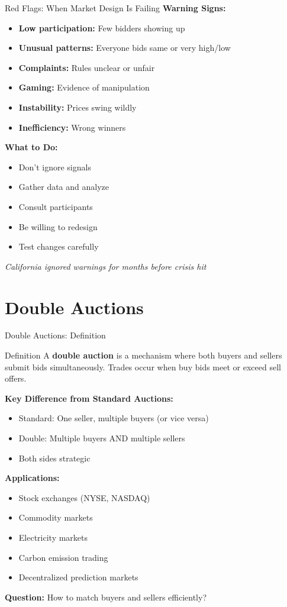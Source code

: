 \documentclass[xcolor={x11names}, aspectratio=169 ]{beamer}
\begin{document}
\begin{frame}{Red Flags: When Market Design Is Failing}
\textbf{Warning Signs:}
\begin{itemize}
  \item \textbf{Low participation:} Few bidders showing up
  \item \textbf{Unusual patterns:} Everyone bids same or very high/low
  \item \textbf{Complaints:} Rules unclear or unfair
  \item \textbf{Gaming:} Evidence of manipulation
  \item \textbf{Instability:} Prices swing wildly
  \item \textbf{Inefficiency:} Wrong winners
\end{itemize}

\textbf{What to Do:}
\begin{itemize}
  \item Don't ignore signals
  \item Gather data and analyze
  \item Consult participants
  \item Be willing to redesign
  \item Test changes carefully
\end{itemize}

\textit{California ignored warnings for months before crisis hit}
\end{frame}

\part{Double Auctions}

\begin{frame}{Double Auctions: Definition}
\begin{block}{Definition}
A \textbf{double auction} is a mechanism where both buyers and sellers submit bids simultaneously. Trades occur when buy bids meet or exceed sell offers.
\end{block}

\textbf{Key Difference from Standard Auctions:}
\begin{itemize}
\item Standard: One seller, multiple buyers (or vice versa)
\item Double: Multiple buyers AND multiple sellers
\item Both sides strategic
\end{itemize}

\textbf{Applications:}
\begin{itemize}
  \item Stock exchanges (NYSE, NASDAQ)
  \item Commodity markets
  \item Electricity markets
  \item Carbon emission trading
  \item Decentralized prediction markets
\end{itemize}

\textbf{Question:} How to match buyers and sellers efficiently?
\end{frame}
\end{document}
